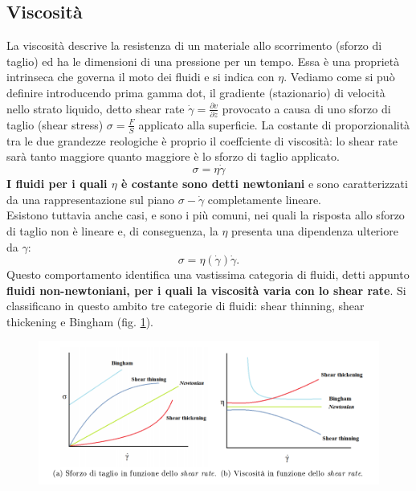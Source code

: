 \documentclass[letterpaper,12pt]{article}
\begin{document}
\subsection{Viscosità}
La viscosità descrive la resistenza di un materiale allo scorrimento (sforzo di taglio) ed ha le dimensioni di una pressione per un tempo.
Essa è una proprietà intrinseca che governa il moto dei fluidi e si indica con $\eta$. Vediamo come si può definire introducendo prima gamma dot, il gradiente  (stazionario) di velocità nello strato liquido, detto shear rate $\dot{\gamma} = \frac{\partial v}{\partial z}$ provocato a causa di uno sforzo di taglio (shear stress) $\sigma=\frac{F}{S}$ applicato alla superficie. La costante di proporzionalità tra le due grandezze
reologiche è proprio il coeffciente di viscosità: lo shear rate sarà tanto maggiore quanto maggiore è lo sforzo di taglio applicato.
\begin{equation}
\sigma=\eta\dot{\gamma}
\end{equation} 
\textbf{I fluidi per i quali $\eta$ è costante sono detti newtoniani} e sono caratterizzati da una rappresentazione sul piano $\sigma-\dot{\gamma}$ completamente lineare. \\
Esistono tuttavia anche casi, e sono i più comuni, nei quali la risposta allo sforzo di taglio non è lineare e, di conseguenza, la $\eta$ presenta una dipendenza ulteriore da $\gamma$:
\begin{equation}
\sigma=\eta(\dot{\gamma})\dot{\gamma}.
\end{equation} 
Questo comportamento identifica una vastissima categoria di fluidi, detti
appunto\textbf{ fluidi non-newtoniani, per i quali la viscosità varia con lo shear
rate}. Si classificano in questo ambito tre categorie di fluidi: shear
thinning, shear thickening e Bingham (fig. \ref{fig:3}).
\begin{figure}[h!] 
	\centering \includegraphics[width=1\columnwidth]{Nonnewtoniani.PNG}
	\label{fig:3}
\end{figure}
\end{document}
